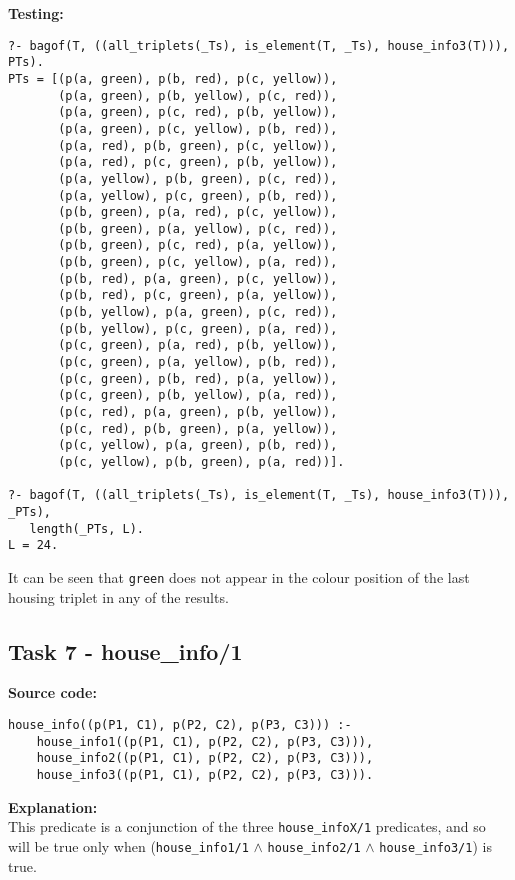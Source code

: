 \documentclass[11pt]{article}
\begin{document}
\textbf{Testing:}
\begin{verbatim}
?- bagof(T, ((all_triplets(_Ts), is_element(T, _Ts), house_info3(T))), PTs).    
PTs = [(p(a, green), p(b, red), p(c, yellow)),  
       (p(a, green), p(b, yellow), p(c, red)),  
       (p(a, green), p(c, red), p(b, yellow)),  
       (p(a, green), p(c, yellow), p(b, red)),  
       (p(a, red), p(b, green), p(c, yellow)),  
       (p(a, red), p(c, green), p(b, yellow)),  
       (p(a, yellow), p(b, green), p(c, red)),  
       (p(a, yellow), p(c, green), p(b, red)),  
       (p(b, green), p(a, red), p(c, yellow)),  
       (p(b, green), p(a, yellow), p(c, red)),  
       (p(b, green), p(c, red), p(a, yellow)),  
       (p(b, green), p(c, yellow), p(a, red)),  
       (p(b, red), p(a, green), p(c, yellow)),  
       (p(b, red), p(c, green), p(a, yellow)),  
       (p(b, yellow), p(a, green), p(c, red)),  
       (p(b, yellow), p(c, green), p(a, red)),  
       (p(c, green), p(a, red), p(b, yellow)),  
       (p(c, green), p(a, yellow), p(b, red)),  
       (p(c, green), p(b, red), p(a, yellow)),  
       (p(c, green), p(b, yellow), p(a, red)),  
       (p(c, red), p(a, green), p(b, yellow)),  
       (p(c, red), p(b, green), p(a, yellow)),  
       (p(c, yellow), p(a, green), p(b, red)),  
       (p(c, yellow), p(b, green), p(a, red))].

?- bagof(T, ((all_triplets(_Ts), is_element(T, _Ts), house_info3(T))), _PTs),      
   length(_PTs, L).
L = 24.
\end{verbatim}

It can be seen that {\verb|green|} does not appear in the colour position of the last housing triplet in any of the results.
\newpage

\subsection{Task 7 - house\_info/1}
\textbf{Source code:}
\begin{verbatim}
house_info((p(P1, C1), p(P2, C2), p(P3, C3))) :-
    house_info1((p(P1, C1), p(P2, C2), p(P3, C3))),
    house_info2((p(P1, C1), p(P2, C2), p(P3, C3))),
    house_info3((p(P1, C1), p(P2, C2), p(P3, C3))).
\end{verbatim}

\textbf{Explanation:} \\
This predicate is a conjunction of the three {\verb|house_infoX/1|} predicates, and so will be true only when ({\verb|house_info1/1|} $\wedge$ {\verb|house_info2/1|} $\wedge$ {\verb|house_info3/1|}) is true. \\
\end{document}
